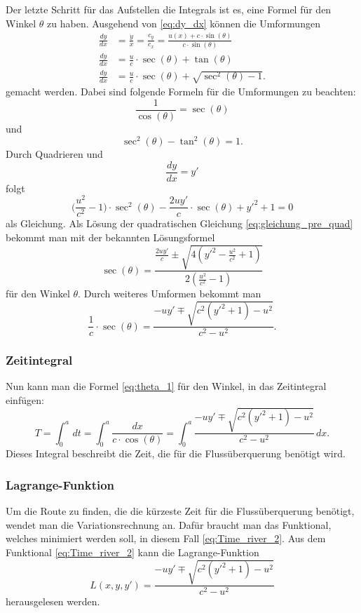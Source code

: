 Der letzte Schritt für das Aufstellen die Integrals ist es, eine
Formel für den Winkel \(\theta\) zu haben.
Ausgehend von \eqref{eq:dy_dx} können die Umformungen  
\begin{align}
    \frac{dy}{dx} &= \frac{\dot{y}}{\dot{x}} = \frac{c_y}{c_x} = \frac{u(x) + c \cdot \sin(\theta)}{c \cdot \sin(\theta)} \\
    \frac{dy}{dx} &= \frac{u}{c}\cdot \sec(\theta) + \tan(\theta) \\
    \frac{dy}{dx} &= \frac{u}{c}\cdot \sec(\theta) + \sqrt{\sec^2(\theta)-1}. 
\end{align}
gemacht werden. Dabei sind folgende Formeln für die Umformungen zu
beachten: \[\frac{1}{\cos(\theta)} = \sec(\theta)\] und
\[\sec^2(\theta)-\tan^2(\theta) = 1.\] Durch Quadrieren und
\[\frac{dy}{dx} = y'\] folgt
\begin{equation}
    \biggl(\frac{u^2}{c^2}-1 \biggr) \cdot \sec^2(\theta) - \frac{2uy'}{c}\cdot \sec(\theta) + y'^2 +1 = 0 \label{eq:gleichung_pre_quad}
\end{equation}
als Gleichung. Als Lösung der quadratischen Gleichung
\eqref{eq:gleichung_pre_quad} bekommt man mit der bekannten
Lösungsformel
\begin{equation}
    \sec(\theta) = \frac{\frac{2uy'}{c} \pm \sqrt{4(y'^2-\frac{u^2}{c^2} + 1)}}{2(\frac{u^2}{c^2}-1)}
\end{equation}
für den Winkel \(\theta\). Durch weiteres Umformen bekommt man
\begin{equation}
    \frac{1}{c}\cdot \sec(\theta) = \frac{-uy' \mp \sqrt{c^2(y'^2+1)-u^2}}{c^2-u^2} .\label{eq:theta_1}
\end{equation}


\subsubsection{Zeitintegral}

Nun kann man die Formel \eqref{eq:theta_1} für den Winkel, in das Zeitintegral einfügen:
\begin{equation}
    T = \int_0^a\,dt = \int_0^a\frac{dx}{c\cdot \cos(\theta)} = \int_0^a \frac{-uy' \mp \sqrt{c^2(y'^2+1)-u^2}}{c^2-u^2} \,dx.
    \label{eq:Time_river_2} 
\end{equation}
Dieses Integral  beschreibt die Zeit, die für die Flussüberquerung benötigt wird. 



\subsubsection{Lagrange-Funktion} 
Um die Route zu finden, die die kürzeste Zeit für die Flussüberquerung
benötigt, wendet man die Variationsrechnung an. Dafür braucht man
das  Funktional, welches minimiert werden soll, in diesem Fall
\eqref{eq:Time_river_2}.
Aus dem Funktional \eqref{eq:Time_river_2} kann die Lagrange-Funktion
\begin{equation}\label{eq:lagrange_integral}
    L(x, y, y') = \frac{-uy' \mp \sqrt{c^2(y'^2+1)-u^2}}{c^2-u^2}
\end{equation}
herausgelesen werden. 


